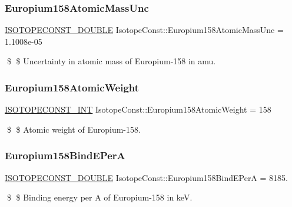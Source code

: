 \subsubsection{\texorpdfstring{Europium158\+Atomic\+Mass\+Unc}{Europium158AtomicMassUnc}}
{\footnotesize\ttfamily \mbox{\hyperlink{group___isotope_const-_macros_ga8f45a7272ce02c0b4c65c44636ed719a}{I\+S\+O\+T\+O\+P\+E\+C\+O\+N\+S\+T\+\_\+\+D\+O\+U\+B\+LE}} Isotope\+Const\+::\+Europium158\+Atomic\+Mass\+Unc = 1.\+1008e-\/05}

\$ \$ Uncertainty in atomic mass of Europium-\/158 in amu. \mbox{\label{group___isotope_const-_europium-_eu158_ga6042d098f45d29f80b1992b2ae8743ae}} 
\subsubsection{\texorpdfstring{Europium158\+Atomic\+Weight}{Europium158AtomicWeight}}
{\footnotesize\ttfamily \mbox{\hyperlink{group___isotope_const-_macros_ga5f18360b3e99483a35c32d789e62621c}{I\+S\+O\+T\+O\+P\+E\+C\+O\+N\+S\+T\+\_\+\+I\+NT}} Isotope\+Const\+::\+Europium158\+Atomic\+Weight = 158}

\$ \$ Atomic weight of Europium-\/158. \mbox{\label{group___isotope_const-_europium-_eu158_gac8f0a6e20248c10a49abb7e22f7261f6}} 
\subsubsection{\texorpdfstring{Europium158\+Bind\+E\+PerA}{Europium158BindEPerA}}
{\footnotesize\ttfamily \mbox{\hyperlink{group___isotope_const-_macros_ga8f45a7272ce02c0b4c65c44636ed719a}{I\+S\+O\+T\+O\+P\+E\+C\+O\+N\+S\+T\+\_\+\+D\+O\+U\+B\+LE}} Isotope\+Const\+::\+Europium158\+Bind\+E\+PerA = 8185.}

\$ \$ Binding energy per A of Europium-\/158 in keV. \mbox{\label{group___isotope_const-_europium-_eu158_ga980c943d809c55b7b52b21753b9d0dda}} 

